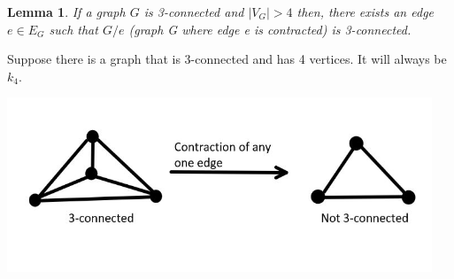 \documentclass{article}
\newtheorem{lemma}{Lemma}
\begin{document}
    \begin{lemma} If a graph $G$ is 3-connected and $|V_{G}|>4$ then, there exists an edge $e\in E_{G}$ such that $G / e$ (graph G where edge e is contracted) is 3-connected.
    \end{lemma}
    
    Suppose there is a graph that is 3-connected and has 4 vertices. It will always be $k_{4}$. 
    \\
    \centerline{\includegraphics[width=5in]{Images/k4.jpg}}
    \\
\end{document}
